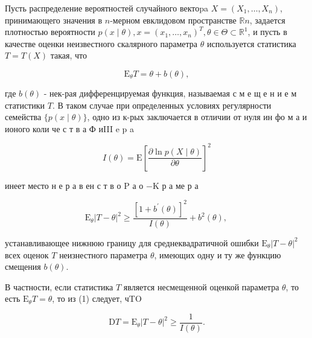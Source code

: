\documentclass[10pt]{article}
\begin{document}
Пусть распределение вероятностей случайного вектоpa $X=\left(X_{1}, \ldots, X_{n}\right)$, принимающего значения в $n$-мерном евклидовом пространстве $\mathbb{R} n$, задается плотностью вероятности $p(x \mid \theta), x=\left(x_{1}, \ldots, x_{n}\right)^{T}, \theta \in \Theta \subset \mathbb{R}^{1}$, и пусть в качестве оценки неизвестного скалярного параметра $\theta$ используется статистика $T=T(X)$ такая, что



\[

\mathrm{E}_{\theta} T=\theta+b(\theta),

\]



где $b(\theta)$ - нек-рая дифференцируемая функция, называемая с м е щ е н и е м статистики $T$. В таком случае при определенных условиях регулярности семейства $\{p(x \mid \theta)\}$, одно из к-рых заключается в отличии от нуля ин фо м а и ионого коли че с т в а Ф иIII e p a



\[

I(\theta)=\mathrm{E}\left[\frac{\partial \ln p(X \mid \theta)}{\partial \theta}\right]^{2}

\]



инеет место н е р а в ен с т в о $\mathrm{P}$ а о $-\mathrm{K}$ р а ме р а



\[

\mathrm{E}_{\theta}|T-\theta|^{2} \geqslant \frac{\left[1+b^{\prime}(\theta)\right]^{2}}{I(\theta)}+b^{2}(\theta) \text {, }

\]



устанавливающее нижнюю границу для среднеквадратичной ошибки $\mathrm{E}_{\theta}|T-\theta|^{2}$ всех оценок $T$ неизнестного параметра $\theta$, имеющих одну и ту же функцию смещения $b(\theta)$.



В частности, если статистика $T$ является несмещенной оценкой параметра $\theta$, то есть $\mathrm{E}_{\theta} T=\theta$, то из (1) следует, чTO



\[

\mathrm{D} T=\mathrm{E}_{\theta}|T-\theta|^{2} \geqslant \frac{1}{I(\theta)} .

\]
\end{document}
